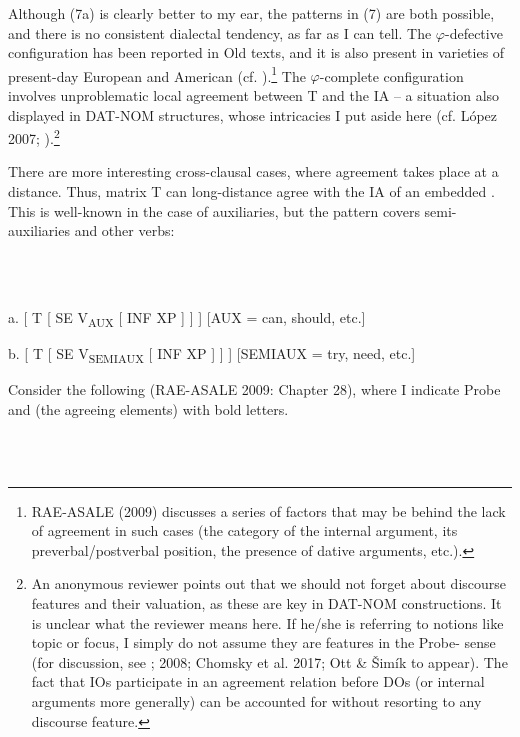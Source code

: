 \documentclass[output=paper]{langsci/langscibook}
\begin{document}
Although (7a) is clearly better to my ear, the patterns in (7) are both possible, and there is no consistent dialectal tendency, as far as I can tell. The $\varphi $-defective configuration has been reported in Old  texts, and it is also present in varieties of present-day European and American  (cf. \citealt{Mendikoetxea1999}).\footnote{RAE-ASALE (2009) discusses a series of factors that may be behind the lack of agreement in such cases (the category of the internal argument, its preverbal/postverbal position, the presence of dative arguments, etc.).} The $\varphi $-complete configuration involves unproblematic local agreement between T and the IA – a situation also displayed in DAT-NOM structures, whose intricacies I put aside here (cf. López 2007; \citealt{Chomsky2008}).\footnote{An anonymous reviewer points out that we should not forget about discourse features and their valuation, as these are key in DAT-NOM constructions. It is unclear what the reviewer means here. If he/she is referring to notions like topic or focus, I simply do not assume they are features in the Probe- sense (for discussion, see \citealt{Chomsky2001}; 2008; Chomsky et al. 2017; Ott \& Šimík to appear). The fact that IOs participate in an agreement relation before DOs (or internal arguments more generally)  can be accounted for without resorting to any discourse feature.} 

  There are more interesting cross-clausal cases, where agreement takes place at a distance. Thus, matrix T can long-distance agree with the IA of an embedded . This is well-known in the case of auxiliaries, but the pattern covers semi-auxiliaries and other verbs: 

\ea%
    \label{ex:key:8}
    \gll\\
        \\
    \glt
    \z

          a. [ T [ SE  V\textsubscript{AUX}         [ INF XP ] ] ]      [AUX = can, should, etc.]

  b. [ T [ SE  V\textsubscript{SEMIAUX}  [ INF XP ] ] ]     [SEMIAUX = try, need, etc.]

Consider the following (RAE-ASALE 2009: Chapter 28), where I indicate Probe and  (the agreeing elements) with bold letters.

\ea%
    \label{ex:key:9}
    \gll\\
        \\
    \glt
    \z

\end{document}

